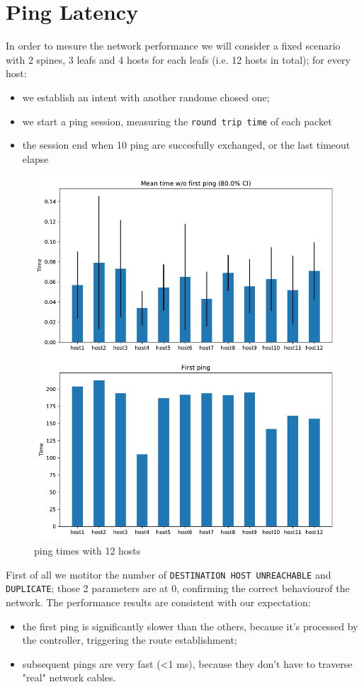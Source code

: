 \section{Ping Latency}
In order to mesure the network performance we will consider a fixed scenario with 2 spines, 3 leafs and 4 hosts for each leafs (i.e. 12 hosts in total);
for every host:
\begin{itemize}
    \item  we establish an intent with another randome chosed one;
    \item  we start a ping session, measuring the \texttt{round trip time} of each packet
    \item  the session end when 10 ping are succesfully exchanged, or the last timeout elapse
\end{itemize} 
\begin{figure}[ht]
    \centering
    \includegraphics[width=.92\textwidth]{img/mean_ping_time.pdf}
    \caption{ping times with 12 hosts}
\end{figure}
First of all we motitor the number of \texttt{DESTINATION HOST UNREACHABLE} and \texttt{DUPLICATE}; those 2 parameters are at 0, confirming the correct
behaviourof the network.
The performance results are consistent with our expectation:
\begin{itemize}
    \item the first ping is significantly slower than the others, because it's processed by the controller, triggering the route establishment;
    \item subsequent pings are very fast (<1 ms), because they don't have to traverse "real" network cables.
\end{itemize}